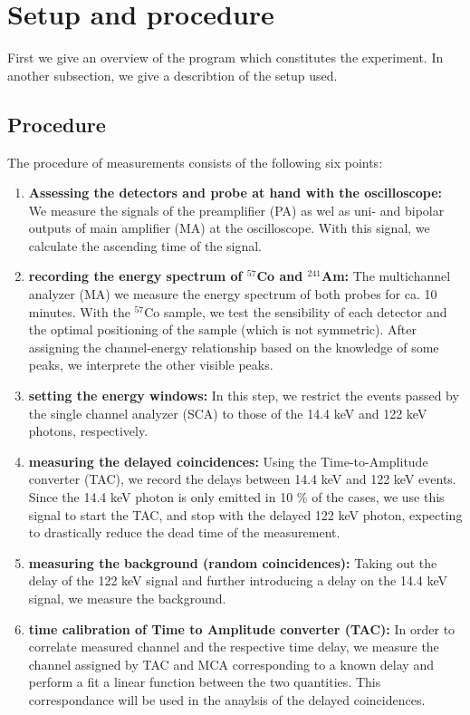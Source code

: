 \section{Setup and procedure}
First we give an overview of the program which constitutes the experiment. In another subsection, 
we give a describtion of the setup used. 
\subsection{Procedure}
The procedure of measurements consists of the following six points:
\begin{enumerate}
    \item 
        \textbf{Assessing the detectors and probe at hand with the oscilloscope:}
        We measure the signals of the preamplifier (PA) as wel as uni- and bipolar outputs of 
        main amplifier (MA) at the oscilloscope. With this signal, we calculate the ascending time 
        of the signal.
    \item 
        \label{it:task2}
        \textbf{recording the energy spectrum of $^{57}$Co and $^{241}$Am:}
        The multichannel analyzer (MA) we measure the energy spectrum of both probes 
        for ca. 10 minutes. With the $^{57}$Co sample, we test the sensibility of each detector
        and the optimal positioning of the sample (which is not symmetric). After assigning the 
        channel-energy relationship based on the knowledge of some peaks, we interprete the other visible peaks.
    \item
        \textbf{setting the energy windows:}
        In this step, we restrict the events passed by the single channel analyzer (SCA) to those 
        of the 14.4 keV and 122 keV photons, respectively.
    \item
        \textbf{measuring the delayed coincidences:}
        Using the Time-to-Amplitude converter (TAC), we record the delays between 14.4 keV and 122 keV 
        events. Since the 14.4 keV photon is only emitted in 10 \% of the cases, we use this signal to start the 
        TAC, and stop with the delayed 122 keV photon, expecting to drastically reduce the dead time of the 
        measurement.
    \item
        \textbf{measuring the background (random coincidences):}
        Taking out the delay of the 122 keV signal and further introducing a delay on the 14.4 keV signal, 
        we measure the background. 
    \item
        \textbf{time calibration of Time to Amplitude converter (TAC):}
        In order to correlate measured channel and the respective time delay, we measure the channel 
        assigned by TAC and MCA corresponding to a known delay and perform a fit a linear function between 
        the two quantities. This correspondance will be used in the anaylsis of the delayed coincidences. 
\end{enumerate}


